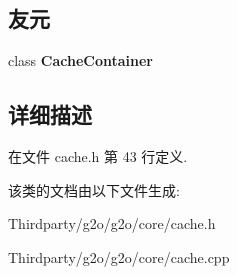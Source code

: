 \subsection*{友元}
\begin{DoxyCompactItemize}
\item 
\hypertarget{classg2o_1_1Cache_1_1CacheKey_a86dec1e0424aa4ae4e6867c69efd7868}{class {\bfseries Cache\-Container}}\label{classg2o_1_1Cache_1_1CacheKey_a86dec1e0424aa4ae4e6867c69efd7868}

\end{DoxyCompactItemize}


\subsection{详细描述}


在文件 cache.\-h 第 43 行定义.



该类的文档由以下文件生成\-:\begin{DoxyCompactItemize}
\item 
Thirdparty/g2o/g2o/core/cache.\-h\item 
Thirdparty/g2o/g2o/core/cache.\-cpp\end{DoxyCompactItemize}
